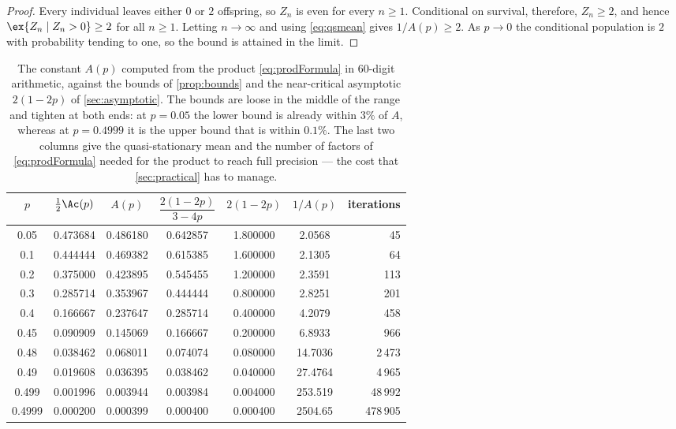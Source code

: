 \begin{proof}
Every individual leaves either $0$ or $2$ offspring, so $Z_n$ is even for every
$n\ge1$. Conditional on survival, therefore, $Z_n\ge2$, and hence
$\ex{Z_n\mid Z_n>0}\ge2$ for all $n\ge1$. Letting $n\to\infty$ and using
\cref{eq:qsmean} gives $1/A(p)\ge2$. As $p\to0$ the conditional population is $2$
with probability tending to one, so the bound is attained in the limit.
\end{proof}

\begin{table}[ht]
\centering
\caption{The constant $A(p)$ computed from the product \cref{eq:prodFormula} in
$60$-digit arithmetic, against the bounds of \cref{prop:bounds} and the
near-critical asymptotic $2(1-2p)$ of \cref{sec:asymptotic}. The bounds are loose
in the middle of the range and tighten at both ends: at $p=0.05$ the lower bound is
already within $3\%$ of $A$, whereas at $p=0.4999$ it is the upper bound that is
within $0.1\%$. The last two columns give the quasi-stationary mean and the number
of factors of \cref{eq:prodFormula} needed for the product to reach full precision
--- the cost that \cref{sec:practical} has to manage.}
\label{tab:Avals}
\begin{tabular}{ccccccr}
\toprule
$p$ & $\tfrac12\Ac(p)$ & $A(p)$ & $\dfrac{2(1-2p)}{3-4p}$ & $2(1-2p)$ & $1/A(p)$ & iterations\\
\midrule
0.05   & 0.473684 & 0.486180 & 0.642857 & 1.800000 & 2.0568 & 45 \\
0.1    & 0.444444 & 0.469382 & 0.615385 & 1.600000 & 2.1305 & 64 \\
0.2    & 0.375000 & 0.423895 & 0.545455 & 1.200000 & 2.3591 & 113 \\
0.3    & 0.285714 & 0.353967 & 0.444444 & 0.800000 & 2.8251 & 201 \\
0.4    & 0.166667 & 0.237647 & 0.285714 & 0.400000 & 4.2079 & 458 \\
0.45   & 0.090909 & 0.145069 & 0.166667 & 0.200000 & 6.8933 & 966 \\
0.48   & 0.038462 & 0.068011 & 0.074074 & 0.080000 & 14.7036 & 2\,473 \\
0.49   & 0.019608 & 0.036395 & 0.038462 & 0.040000 & 27.4764 & 4\,965 \\
0.499  & 0.001996 & 0.003944 & 0.003984 & 0.004000 & 253.519 & 48\,992 \\
0.4999 & 0.000200 & 0.000399 & 0.000400 & 0.000400 & 2504.65 & 478\,905 \\
\bottomrule
\end{tabular}
\end{table}

